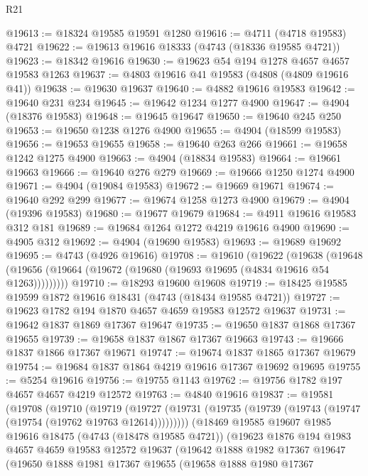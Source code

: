 \begin{lexlean}{R21}
\begin{coremodule}
@19613 := @18324 @19585 @19591 @1280
@19616 := @4711 (@4718 @19583) @4721
@19622 := @19613 @19616 @18333 (@4743 (@18336 @19585 @4721))
@19623 := @18342 @19616
@19630 := @19623 @54 @194 @1278 @4657 @4657 @19583 @1263
@19637 := @4803 @19616 @41 @19583 (@4808 (@4809 @19616 @41))
@19638 := @19630 @19637
@19640 := @4882 @19616 @19583
@19642 := @19640 @231 @234
@19645 := @19642 @1234 @1277 @4900
@19647 := @4904 (@18376 @19583)
@19648 := @19645 @19647
@19650 := @19640 @245 @250
@19653 := @19650 @1238 @1276 @4900
@19655 := @4904 (@18599 @19583)
@19656 := @19653 @19655
@19658 := @19640 @263 @266
@19661 := @19658 @1242 @1275 @4900
@19663 := @4904 (@18834 @19583)
@19664 := @19661 @19663
@19666 := @19640 @276 @279
@19669 := @19666 @1250 @1274 @4900
@19671 := @4904 (@19084 @19583)
@19672 := @19669 @19671
@19674 := @19640 @292 @299
@19677 := @19674 @1258 @1273 @4900
@19679 := @4904 (@19396 @19583)
@19680 := @19677 @19679
@19684 := @4911 @19616 @19583 @312 @181
@19689 := @19684 @1264 @1272 @4219 @19616 @4900
@19690 := @4905 @312
@19692 := @4904 (@19690 @19583)
@19693 := @19689 @19692
@19695 := @4743 (@4926 @19616)
@19708 := @19610
    (@19622
      (@19638
        (@19648 (@19656 (@19664 (@19672 (@19680 (@19693 @19695 (@4834 @19616 @54 @1263)))))))))
@19710 := @18293 @19600 @19608
@19719 := @18425 @19585 @19599 @1872 @19616 @18431 (@4743 (@18434 @19585 @4721))
@19727 := @19623 @1782 @194 @1870 @4657 @4659 @19583 @12572 @19637
@19731 := @19642 @1837 @1869 @17367 @19647
@19735 := @19650 @1837 @1868 @17367 @19655
@19739 := @19658 @1837 @1867 @17367 @19663
@19743 := @19666 @1837 @1866 @17367 @19671
@19747 := @19674 @1837 @1865 @17367 @19679
@19754 := @19684 @1837 @1864 @4219 @19616 @17367 @19692 @19695
@19755 := @5254 @19616
@19756 := @19755 @1143
@19762 := @19756 @1782 @197 @4657 @4657 @4219 @12572
@19763 := @4840 @19616
@19837 := @19581
    (@19708
      (@19710
        (@19719
          (@19727 (@19731 (@19735 (@19739 (@19743 (@19747 (@19754 (@19762 @19763 @12614)))))))))
        (@18469
          @19585
          @19607
          @1985
          @19616
          @18475
          (@4743 (@18478 @19585 @4721))
          (@19623
            @1876
            @194
            @1983
            @4657
            @4659
            @19583
            @12572
            @19637
            (@19642
              @1888
              @1982
              @17367
              @19647
              (@19650
                @1888
                @1981
                @17367
                @19655
                (@19658
                  @1888
                  @1980
                  @17367

\end{coremodule}
\end{lexlean}
